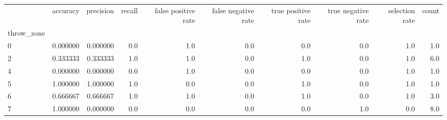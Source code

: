 \begin{tabular}{lrrrrrrrrr}
\toprule
{} &  accuracy &  precision &  recall &  false positive rate &  false negative rate &  true positive rate &  true negative rate &  selection rate &  count \\
throw\_zone &           &            &         &                      &                      &                     &                     &                 &        \\
\midrule
0          &  0.000000 &   0.000000 &     0.0 &                  1.0 &                  0.0 &                 0.0 &                 0.0 &             1.0 &    1.0 \\
2          &  0.333333 &   0.333333 &     1.0 &                  1.0 &                  0.0 &                 1.0 &                 0.0 &             1.0 &    6.0 \\
4          &  0.000000 &   0.000000 &     0.0 &                  1.0 &                  0.0 &                 0.0 &                 0.0 &             1.0 &    1.0 \\
5          &  1.000000 &   1.000000 &     1.0 &                  0.0 &                  0.0 &                 1.0 &                 0.0 &             1.0 &    1.0 \\
6          &  0.666667 &   0.666667 &     1.0 &                  1.0 &                  0.0 &                 1.0 &                 0.0 &             1.0 &    3.0 \\
7          &  1.000000 &   0.000000 &     0.0 &                  0.0 &                  0.0 &                 0.0 &                 1.0 &             0.0 &    8.0 \\
\bottomrule
\end{tabular}
